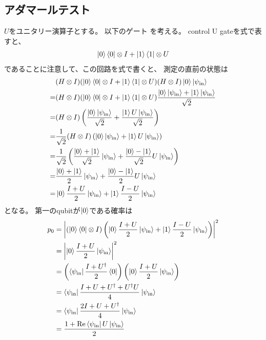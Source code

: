 \documentclass[]{ltjsarticle}
\renewcommand{\Re}{\mathrm{Re}}
\begin{document}
\subsection{アダマールテスト}
$U$をユニタリー演算子とする。
以下のゲート
を考える。
control U gateを式で表すと、
\begin{align}
    \ket{0}\bra{0}\otimes I + \ket{1}\bra{1}\otimes U
\end{align}
であることに注意して、この回路を式で書くと、
測定の直前の状態は
\begin{align}
    &(H\otimes I) 
    (\ket{0}\bra{0}\otimes I + \ket{1}\bra{1}\otimes U)
    (H\otimes I) 
    \ket{0}\ket{\psi_\text{in}} \\
    =
    &(H\otimes I)
    (\ket{0}\bra{0}\otimes I + \ket{1}\bra{1}\otimes U)
    \frac{\ket{0}\ket{\psi_\text{in}} + \ket{1}\ket{\psi_\text{in}}}{\sqrt{2}} \\
    =
    &(H\otimes I)
    \left(
        \frac{\ket{0}\ket{\psi_\text{in}}}{\sqrt{2}}
        +
        \frac{\ket{1}U\ket{\psi_\text{in}}}{\sqrt{2}}
    \right) \\
    =
    &\frac{1}{\sqrt{2}}
    (H\otimes I)
    \left(
        \ket{0}\ket{\psi_\text{in}}
        +
        \ket{1}U\ket{\psi_\text{in}}
    \right) \\
    =
    &\frac{1}{\sqrt{2}}
    \left(
        \frac{\ket{0} + \ket{1}}{\sqrt{2}}\ket{\psi_\text{in}}
        +
        \frac{\ket{0} - \ket{1}}{\sqrt{2}}U\ket{\psi_\text{in}}
    \right) \\
    =
    &
    \frac{\ket{0} + \ket{1}}{2}\ket{\psi_\text{in}}
    +
    \frac{\ket{0} - \ket{1}}{2}U\ket{\psi_\text{in}} \\
    =
    &
    \ket{0}\frac{I + U}{2}\ket{\psi_\text{in}}
    +
    \ket{1}\frac{I - U}{2}\ket{\psi_\text{in}}
\end{align}
となる。
第一のqubitが$\ket{0}$である確率は
\begin{align}
    p_0
    &=
    \left|
        (\ket{0}\bra{0} \otimes I)
        \left(
            \ket{0}\frac{I + U}{2}\ket{\psi_\text{in}}
            +
            \ket{1}\frac{I - U}{2}\ket{\psi_\text{in}}
        \right)
    \right|^2 \\
    &=
    \left|
        \ket{0}\frac{I + U}{2}\ket{\psi_\text{in}}
    \right|^2 \\
    &=
    \left(
        \bra{\psi_\text{in}}\frac{I + U^\dagger}{2}\bra{0}
    \right)
    \left(
        \ket{0}\frac{I + U}{2}\ket{\psi_\text{in}}
    \right) \\
    &=
    \bra{\psi_\text{in}}
    \frac{I + U + U^\dagger + U^\dagger U}{4}
    \ket{\psi_\text{in}} \\
    &=
    \bra{\psi_\text{in}}
    \frac{2I + U + U^\dagger}{4}
    \ket{\psi_\text{in}} \\
    &=
    \frac{1 + \Re\bra{\psi_\text{in}}U\ket{\psi_\text{in}}}{2}
\end{align}
\end{document}

